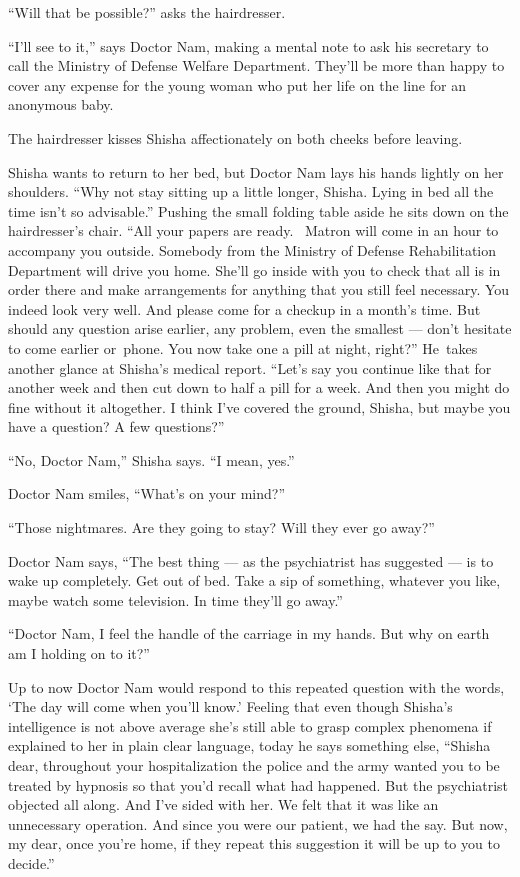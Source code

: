 \documentclass[twoside,11pt]{book}
\begin{document}
``Will that be possible?'' asks the hairdresser.

``I'll see to it,'' says Doctor Nam, making a mental note to ask his secretary to call the
Ministry of Defense Welfare Department. They'll be more than happy to cover any expense for the young woman who put her
life on the line for an anonymous baby.

The hairdresser kisses Shisha affectionately on both cheeks before leaving.

Shisha wants to return to her bed, but Doctor Nam lays his hands lightly on    her shoulders. ``Why not
stay sitting up a little longer, Shisha. Lying in bed all the time isn't so advisable.''  Pushing the
small folding table aside he sits down on the hairdresser's chair. ``All your papers are
ready.{~} Matron will come in an hour to accompany you outside. Somebody from the Ministry of Defense
Rehabilitation Department will drive you home. She'll go inside with you to check that all is in order there and make
arrangements for anything that you still feel necessary. You indeed look very well. And please come for a checkup in a
month's time.  But should any question arise earlier, any problem, even the smallest --- don't hesitate to come earlier
or~phone. You now take one a pill at night, right?'' He~takes another glance at Shisha's medical report.
``Let's say you continue like that for another week and then cut down to half a pill for a week. And then
you might do fine without it altogether. I think I've covered the ground, Shisha, but maybe you have a question? A few
questions?''

``No, Doctor Nam,'' Shisha says. ``I mean, yes.''

Doctor Nam smiles, ``What's on your mind?''

``Those nightmares. Are they going to stay? Will they ever go away?''

Doctor Nam says, ``The best thing --- as the psychiatrist has suggested --- is to wake up completely. Get out
of bed. Take a sip of something,{ }whatever you like, maybe watch some
television. In time they'll go away.''

``Doctor Nam, I feel the handle of the carriage in my hands. But why on earth am I holding on to
it?''

Up to now Doctor Nam would respond to this repeated question with the words, `The day will come when you'll know.'
Feeling that even though Shisha's intelligence is not above average she's still able to grasp complex phenomena if
explained to her in plain clear language, today he says something else, ``Shisha dear, throughout your
hospitalization the police and the army wanted you to be treated by hypnosis so that you'd recall what had happened.
But the psychiatrist objected all along. And I've sided with her. We felt that it was like an unnecessary operation.
And since you were our patient, we had the say. But now, my dear, once you're home, if they repeat this suggestion it
will be up to you to decide.''
\end{document}

